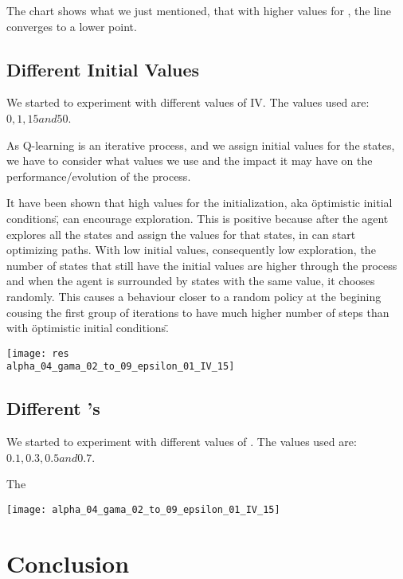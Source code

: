 \documentclass{article}
\begin{document}
The chart shows what we just mentioned, that with higher values for \gamma, the
line converges to a lower point.

\subsection{Different Initial Values}
We started to experiment with different values of IV. The values used are:
$0, 1, 15 and 50$. 

As Q-learning is an iterative process, and we assign initial values for the
states, we have to consider what values we use and the impact it may have on the
performance/evolution of the process.

It have been shown that high values for the initialization, aka \"optimistic
initial conditions\", can encourage exploration. This is positive because after
the agent explores all the states and assign the values for that states, in can
start optimizing paths.
With low initial values, consequently low exploration, the number of states that
still have the initial values are higher through the process and when the agent
is surrounded by states with the same value, it chooses randomly. This causes a
behaviour closer to a random policy at the begining cousing the first group of
iterations to have much higher number of steps than with \"optimistic
initial conditions\".

\texttt{[image: res\\alpha\_04\_gama\_02\_to\_09\_epsilon\_01\_IV\_15]}

\subsection{Different \epsilon's}
We started to experiment with different values of \epsilon. The values used are:
$0.1, 0.3, 0.5 and 0.7$.

The 

\texttt{[image: alpha\_04\_gama\_02\_to\_09\_epsilon\_01\_IV\_15]}

\section{Conclusion}
\end{document}
